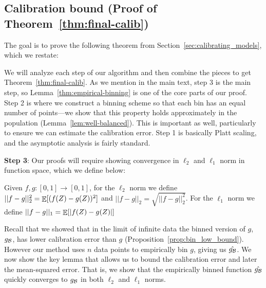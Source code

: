 
\subsection{Calibration bound (Proof of Theorem~\ref{thm:final-calib})}

The goal is to prove the following theorem from Section~\ref{sec:calibrating_models}, which we restate:

\begin{finalCalib}
\finalCalibText{}
\end{finalCalib}


We will analyze each step of our algorithm and then combine the pieces to get Theorem~\ref{thm:final-calib}.
As we mention in the main text, step 3 is the main step, so Lemma~\ref{thm:empirical-binning} is one of the core parts of our proof.
Step 2 is where we construct a binning scheme so that each bin has an equal number of points---we show that this property holds approximately in the population (Lemma~\ref{lem:well-balanced}).
This is important as well, particularly to ensure we can estimate the calibration error.
Step 1 is basically Platt scaling, and the asymptotic analysis is fairly standard.

\textbf{Step 3}: Our proofs will require showing convergence in $\ell_2$ and $\ell_1$ norm in function space, which we define below:

\begin{definition}
Given $f, g : [0, 1] \to [0, 1]$, for the $\ell_2$ norm we define $||f - g||_2^2 = \mathop{\mathbb{E}}[(f(Z) - g(Z))^2]$ and $||f- g||_2 = \sqrt{||f - g||_2^2}$. For the $\ell_1$ norm we define $||f - g||_1 = \mathop{\mathbb{E}}[\lvert f(Z) - g(Z)\rvert]$
\end{definition}

Recall that we showed that in the limit of infinite data the binned version of $g$, $g_{\mathcal{B}{}}$, has lower calibration error than $g$ (Proposition~\ref{prop:bin_low_bound}). However our method uses $n$ data points to empirically bin $g$, giving us $\hat{g_{\mathcal{B}{}}}$. We now show the key lemma that allows us to bound the calibration error and later the mean-squared error. That is, we show that the empirically binned function $\hat{g_{\mathcal{B}{}}}$ quickly converges to $g_{\mathcal{B}{}}$ in both $\ell_2$ and $\ell_1$ norms.

